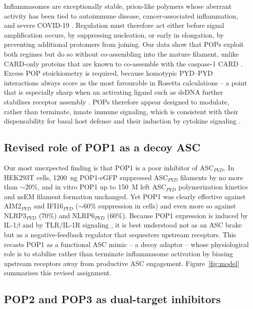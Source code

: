 \documentclass[11pt]{article}
\begin{document}
Inflammasomes are exceptionally stable, prion-like polymers whose aberrant
activity has been tied to autoimmune disease, cancer-associated
inflammation, and severe COVID-19
\citep{cai2014prion, franklin2014adaptor, sharma2018pyrin,
vora2021inflammasome, junqueira2022sarscov2}. Regulation must therefore
act either before signal amplification occurs, by suppressing nucleation,
or early in elongation, by preventing additional protomers from joining.
Our data show that POPs exploit both regimes but do so without
co-assembling into the mature filament, unlike CARD-only proteins that
are known to co-assemble with the caspase-1 CARD
\citep{indramohan2018cops}. Excess POP stoichiometry is required, because
homotypic PYD--PYD interactions always score as the most favourable in
Rosetta calculations -- a point that is especially sharp when an
activating ligand such as dsDNA further stabilises receptor assembly
\citep{morrone2015assembly}. POPs therefore appear designed to modulate,
rather than terminate, innate immune signaling, which is consistent with
their dispensability for basal host defense and their induction by
cytokine signaling \citep{dealmeida2015pyrin, ratsimandresy2017pop2,
khare2014pop3}.

\subsection{Revised role of POP1 as a decoy ASC}

Our most unexpected finding is that POP1 is a poor inhibitor of
ASC$_{PYD}$. In HEK293T cells, 1200~ng POP1-eGFP suppressed ASC$_{PYD}$
filaments by no more than $\sim$20\%, and in vitro POP1 up to
150~\textmu M left ASC$_{PYD}$ polymerization kinetics and nsEM
filament formation unchanged. Yet POP1 was clearly effective against
AIM2$_{PYD}$ and IFI16$_{PYD}$ ($\sim$60\% suppression in cells) and even
more so against NLRP3$_{PYD}$ (70\%) and NLRP6$_{PYD}$ (60\%). Because
POP1 expression is induced by IL-1$\beta$ and by TLR/IL-1R signaling
\citep{dealmeida2015pyrin}, it is best understood not as an ASC brake
but as a negative-feedback regulator that sequesters upstream receptors.
This recasts POP1 as a functional ASC mimic -- a decoy adaptor -- whose
physiological role is to stabilise rather than terminate inflammasome
activation by biasing upstream receptors away from productive ASC
engagement. Figure~\ref{fig:model} summarises this revised assignment.

\subsection{POP2 and POP3 as dual-target inhibitors}
\end{document}
